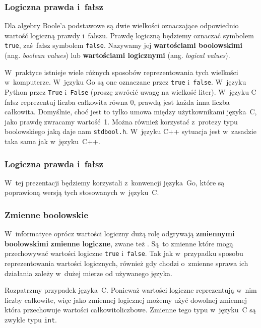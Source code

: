 \documentclass[10pt,t]{beamer}
\begin{document}
\begin{frame}
  \frametitle{Logiczna prawda i~fałsz}


  Dla algebry Boole’a podstawowe są dwie wielkości oznaczające odpowiednio
  wartość logiczną prawdy i~fałszu. Prawdę logiczną będziemy oznaczać
  symbolem \texttt{true}, zaś~fałsz symbolem \texttt{false}. Nazywamy
  jej \textbf{wartościami boolowskimi} (ang. \textit{boolean values})
  lub \textbf{wartościami logicznymi} (ang. \textit{logical values}).

  W~praktyce istnieje wiele różnych sposobów reprezentowania tych wielkości
  w~komputerze. W~języku Go są one oznaczane przez \texttt{true}
  i~\texttt{false}. W~języku Python przez \texttt{True} i~\texttt{False}
  (proszę zwrócić uwagę na wielkość liter). W~języku C fałsz reprezentuj
  liczba całkowita równa 0, prawdą jest każda inna liczba całkowita.
  Domyślnie, choć jest to tylko umowa między użytkownikami języka~C, jako
  prawdę zwracamy wartość~1. Można również korzystać z~protezy typu
  boolowskiego jaką daje nam \texttt{stdbool.h}. W~języku C++ sytuacja jest
  w~zasadzie taka sama jak w~języku~C++.

\end{frame}





\begin{frame}
  \frametitle{Logiczna prawda i~fałsz}


  W~tej prezentacji będziemy korzystali z~konwencji języka~Go, które są
  poprawioną wersją tych stosowanych w~języku~C.

\end{frame}





\begin{frame}
  \frametitle{Zmienne boolowskie}


  W~informatyce oprócz wartości logiczny dużą rolę odgrywają
  \textbf{zmiennymi boolowskimi} \textbf{zmienne logiczne}, zwane też .
  Są~to zmienne które mogą przechowywać wartości logiczne \texttt{true}
  i~\texttt{false}. Tak jak w~przypadku sposobu reprezentowania wartości
  logicznych, również gdy chodzi o~zmienne sprawa ich działania zależy
  w~dużej mierze od używanego języka.

  Rozpatrzmy przypadek języka~C. Ponieważ wartości logiczne reprezentują
  w~nim liczby całkowite, więc jako zmiennej logicznej możemy użyć dowolnej
  zmiennej która przechowuje wartości całkowitoliczbowe. Zmienne tego typu
  w~języku~C są zwykle typu \texttt{int}.

\end{frame}
\end{document}

